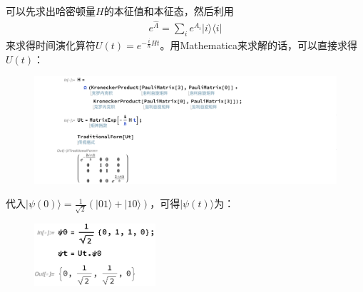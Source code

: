 \documentclass[UTF8,12pt]{article} %
\makeatletter
\newenvironment{proof}[1][\protect\proofname]{\par
\normalfont\topsep6\p@\@plus6\p@\relax
\trivlist
\itemindent\parindent
\item[\hskip\labelsep
\scshape
#1]\ignorespaces
}{%
\endtrivlist\@endpefalse
}
\renewcommand{\proofname}{\it{Solution}}
\makeatother
\begin{document}
\begin{proof}[解]
可以先求出哈密顿量$H$的本征值和本征态，然后利用
\begin{align}
e^{\hat{A}} = \sum_{i} e^{A_{i}}|i\rangle\langle i|
\end{align}
来求得时间演化算符$U(t) = e^{-\frac{i}{\hbar}Ht}$。用Mathematica来求解的话，可以直接求得$U(t)$：
\begin{figure}[H]
\begin{center}
\includegraphics[width=19cm]{ut}
\end{center}
\end{figure}
代入$|\psi(0)\rangle = \frac{1}{\sqrt{2}}(|01\rangle + |10\rangle)$，可得$|\psi(t)\rangle$为：
\begin{figure}[H]
\begin{center}
\includegraphics[width=4.5cm]{psit}
\end{center}
\end{figure}
\end{proof}
\end{document}
